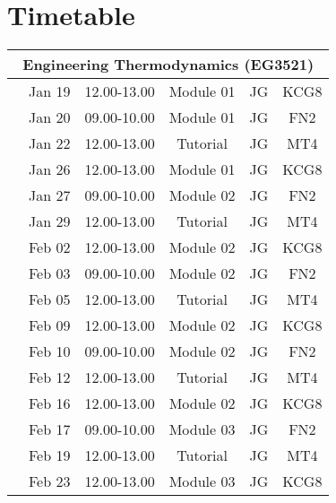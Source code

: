 \documentclass[11pt,oneside,a4paper]{article}
\begin{document}
\section{Timetable}


\begin{center}
\begin{tabular}{||c||c|c|c|c|c||}
\hline\hline
\multicolumn{6}{||c||}{Engineering Thermodynamics (EG3521)} \\
\hline\hline
\multirow{3}{*}{\color{red}{Week 28}} & Jan 19   & 12.00-13.00 & Module 01 & JG  & KCG8 \\
                                      & Jan 20   & 09.00-10.00 & Module 01 & JG  & FN2  \\
                                      & Jan 22   & 12.00-13.00 & Tutorial  & JG  & MT4  \\
\hline
\multirow{3}{*}{\color{red}{Week 29}} & Jan 26   & 12.00-13.00 & Module 01 & JG  & KCG8 \\
                                      & Jan 27   & 09.00-10.00 & Module 02 & JG  & FN2 \\
                                      & Jan 29   & 12.00-13.00 & Tutorial  & JG  & MT4  \\
\hline
\multirow{3}{*}{\color{red}{Week 30}} & Feb 02   & 12.00-13.00 & Module 02 & JG  & KCG8 \\
                                      & Feb 03   & 09.00-10.00 & Module 02 & JG  & FN2  \\
                                      & Feb 05   & 12.00-13.00 & Tutorial  & JG  & MT4  \\
\hline
\multirow{3}{*}{\color{red}{Week 31}} & Feb 09   & 12.00-13.00 & Module 02 & JG  & KCG8 \\
                                      & Feb 10   & 09.00-10.00 & Module 02 & JG  & FN2  \\
                                      & Feb 12   & 12.00-13.00 & Tutorial  & JG  & MT4  \\
\hline
\multirow{3}{*}{\color{red}{Week 32}} & Feb 16   & 12.00-13.00 & Module 02 & JG  & KCG8 \\
                                      & Feb 17   & 09.00-10.00 & Module 03 & JG  & FN2  \\
                                      & Feb 19   & 12.00-13.00 & Tutorial  & JG  & MT4  \\
\hline
\multirow{3}{*}{\color{red}{Week 33}} & Feb 23   & 12.00-13.00 & Module 03 & JG  & KCG8 \\

\end{tabular}
\end{center}
\end{document}
